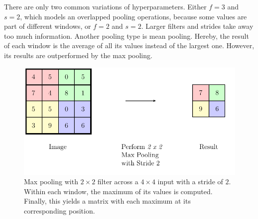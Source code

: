 There are only two common variations of hyperparameters.
Either $f=3$ and $s=2$, which models an overlapped pooling operations, because some values are part of different windows, or $f=2$ and $s=2$.
Larger filters and strides take away too much information.
Another pooling type is mean pooling.
Hereby, the result of each window is the average of all its values instead of the largest one.
However, its results are outperformed by the max pooling\cite{Scherer2010}.
\begin{figure}
	\centering
	\includegraphics{images/pooling.pdf}
	\caption[Max Pooling with $2 \times 2$ Filter and Stride $2$]{Max pooling with $2 \times 2$ filter across a $4 \times 4$ input with a stride of $2$. Within each window, the maximum of its values is computed. Finally, this yields a matrix with each maximum at its corresponding position.}
	\label{fig:pooling}
\end{figure}